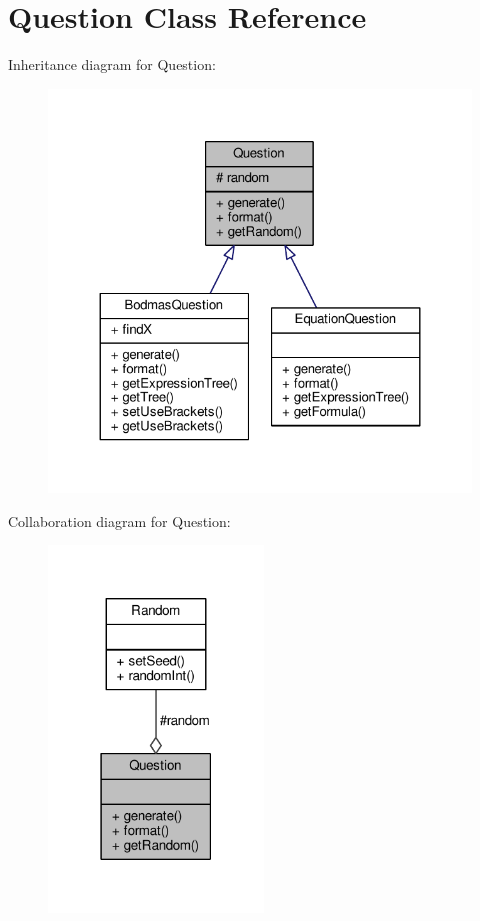 \hypertarget{classQuestion}{}\section{Question Class Reference}
\label{classQuestion}


Inheritance diagram for Question\+:
\nopagebreak
\begin{figure}[H]
\begin{center}
\leavevmode
\includegraphics[width=324pt]{classQuestion__inherit__graph}
\end{center}
\end{figure}


Collaboration diagram for Question\+:
\nopagebreak
\begin{figure}[H]
\begin{center}
\leavevmode
\includegraphics[width=162pt]{classQuestion__coll__graph}
\end{center}
\end{figure}
